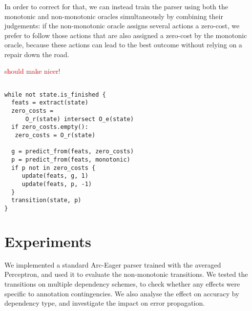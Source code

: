 \documentclass[11pt,letterpaper]{article}
\newcommand{\note}[1]{\textcolor{red}{#1}}
\begin{document}
In order to correct for that, we can instead train the parser using both the
monotonic and non-monotonic oracles simultaneously by combining their
judgements: if the non-monotonic oracle assigns several actions a zero-cost,
we prefer to follow those actions that are also assigned a zero-cost by the
monotonic oracle, because these actions can lead to the best outcome without
relying on a repair down the road.

\note{should make nicer!}
\begin{verbatim}

while not state.is_finished {
  feats = extract(state)
  zero_costs =
      O_r(state) intersect O_e(state)
  if zero_costs.empty():
   zero_costs = O_r(state)

  g = predict_from(feats, zero_costs)
  p = predict_from(feats, monotonic)
  if p not in zero_costs {
     update(feats, g, 1)
     update(feats, p, -1)
  }
  transition(state, p)
}
\end{verbatim}
   

\section{Experiments}

We implemented a standard Arc-Eager parser trained with the averaged Perceptron,
and used it to evaluate the non-monotonic transitions. We tested the transitions on
multiple dependency schemes, to check whether any effects were specific to annotation
contingencies. We also analyse the effect on accuracy by dependency type, and
investigate the impact on error propagation.
\end{document}
